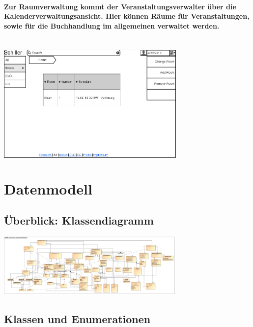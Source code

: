 \documentclass[a4paper]{article}
\begin{document}
\paragraph{Zur Raumverwaltung kommt der Veranstaltungsverwalter über die Kalenderverwaltungsansicht. Hier können Räume für Veranstaltungen, sowie für die Buchhandlung im allgemeinen verwaltet werden.\\ \\}
\includegraphics[width=350px]{19ChangeRoom.png}


\section{Datenmodell}

\subsection{Überblick: Klassendiagramm}

\includegraphics[width=350px]{analyse-klassendiagramm.jpg}

\subsection{Klassen und Enumerationen}
\end{document}
